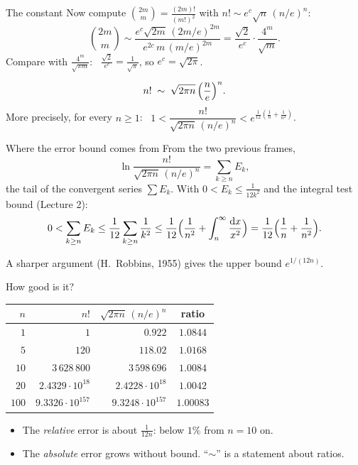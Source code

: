 \documentclass[10pt]{wosm-slides}
\begin{document}
\begin{frame}{The constant}
  Now compute $\binom{2m}{m} = \frac{(2m)!}{(m!)^2}$ with $n! \sim e^c \sqrt n\,(n/e)^n$:
  \[ \binom{2m}{m} \sim \frac{e^c \sqrt{2m}\,(2m/e)^{2m}}{e^{2c}\, m\,(m/e)^{2m}}
     = \frac{\sqrt2}{e^c} \cdot \frac{4^m}{\sqrt m} . \]
  \pause
  Compare with $\frac{4^m}{\sqrt{\pi m}}$: \ $\frac{\sqrt 2}{e^c} = \frac{1}{\sqrt\pi}$, so
  $e^c = \sqrt{2\pi}$.
  \pause
  \begin{theorem}
    \[ n! \;\sim\; \sqrt{2\pi n}\, \Bigl(\frac{n}{e}\Bigr)^n . \]
    More precisely, for every $n \ge 1$:
    \ $1 < \dfrac{n!}{\sqrt{2\pi n}\,(n/e)^n} < e^{\frac{1}{12}\left(\frac1n + \frac{1}{n^2}\right)}$.
  \end{theorem}
\end{frame}

\begin{frame}{Where the error bound comes from}
  From the two previous frames,
  \[ \ln \frac{n!}{\sqrt{2\pi n}\,(n/e)^n} = \sum_{k \ge n} E_k , \]
  the tail of the convergent series $\sum E_k$. \pause With $0 < E_k \le \frac{1}{12k^2}$ and the
  integral test bound (Lecture 2):
  \[ 0 < \sum_{k \ge n} E_k \le \frac{1}{12}\sum_{k \ge n} \frac{1}{k^2}
     \le \frac{1}{12}\Bigl(\frac{1}{n^2} + \int_n^\infty \frac{\mathrm{d}x}{x^2}\Bigr)
     = \frac{1}{12}\Bigl(\frac1n + \frac{1}{n^2}\Bigr) . \]
  \pause
  {\small A sharper argument (H.~Robbins, 1955) gives the upper bound $e^{1/(12n)}$.\par}
\end{frame}

\begin{frame}{How good is it?}
  \begin{center}
  \small\renewcommand{\arraystretch}{1.2}
  \begin{tabular}{rrrc}
    \toprule
    $n$ & $n!$ & $\sqrt{2\pi n}\,(n/e)^n$ & ratio \\
    \midrule
    $1$   & $1$                 & $0.922$                & $1.0844$ \\
    $5$   & $120$               & $118.02$               & $1.0168$ \\
    $10$  & $3\,628\,800$       & $3\,598\,696$          & $1.0084$ \\
    $20$  & $2.4329 \cdot 10^{18}$ & $2.4228 \cdot 10^{18}$ & $1.0042$ \\
    $100$ & $9.3326 \cdot 10^{157}$ & $9.3248 \cdot 10^{157}$ & $1.00083$ \\
    \bottomrule
  \end{tabular}
  \end{center}
  \begin{itemize}
    \item The \emph{relative} error is about $\frac{1}{12n}$: below $1\%$ from $n = 10$ on.
    \item The \emph{absolute} error grows without bound. ``$\sim$'' is a statement about ratios.
  \end{itemize}
\end{frame}
\end{document}

